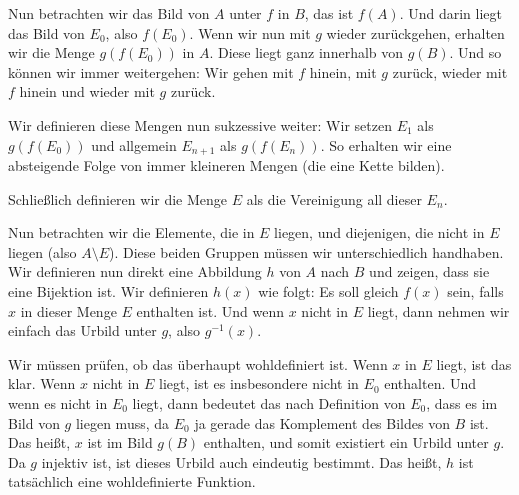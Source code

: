 \begin{spoken-clean}[00:26:00 - 00:27:30]
Nun betrachten wir das Bild von $A$ unter $f$ in $B$, das ist $f(A)$. Und darin liegt das Bild von $E_0$, also $f(E_0)$. Wenn wir nun mit $g$ wieder zurückgehen, erhalten wir die Menge $g(f(E_0))$ in $A$. Diese liegt ganz innerhalb von $g(B)$. Und so können wir immer weitergehen: Wir gehen mit $f$ hinein, mit $g$ zurück, wieder mit $f$ hinein und wieder mit $g$ zurück.

Wir definieren diese Mengen nun sukzessive weiter: Wir setzen $E_1$ als $g(f(E_0))$ und allgemein $E_{n+1}$ als $g(f(E_n))$. So erhalten wir eine absteigende Folge von immer kleineren Mengen (die eine Kette bilden).

Schließlich definieren wir die Menge $E$ als die Vereinigung all dieser $E_n$.
\end{spoken-clean}

\begin{spoken-clean}[00:27:30 - 00:29:10]
Nun betrachten wir die Elemente, die in $E$ liegen, und diejenigen, die nicht in $E$ liegen (also $A \setminus E$). Diese beiden Gruppen müssen wir unterschiedlich handhaben. Wir definieren nun direkt eine Abbildung $h$ von $A$ nach $B$ und zeigen, dass sie eine Bijektion ist. Wir definieren $h(x)$ wie folgt: Es soll gleich $f(x)$ sein, falls $x$ in dieser Menge $E$ enthalten ist. Und wenn $x$ nicht in $E$ liegt, dann nehmen wir einfach das Urbild unter $g$, also $g^{-1}(x)$.

Wir müssen prüfen, ob das überhaupt wohldefiniert ist. Wenn $x$ in $E$ liegt, ist das klar. Wenn $x$ nicht in $E$ liegt, ist es insbesondere nicht in $E_0$ enthalten. Und wenn es nicht in $E_0$ liegt, dann bedeutet das nach Definition von $E_0$, dass es im Bild von $g$ liegen muss, da $E_0$ ja gerade das Komplement des Bildes von $B$ ist. Das heißt, $x$ ist im Bild $g(B)$ enthalten, und somit existiert ein Urbild unter $g$. Da $g$ injektiv ist, ist dieses Urbild auch eindeutig bestimmt. Das heißt, $h$ ist tatsächlich eine wohldefinierte Funktion.
\end{spoken-clean}

